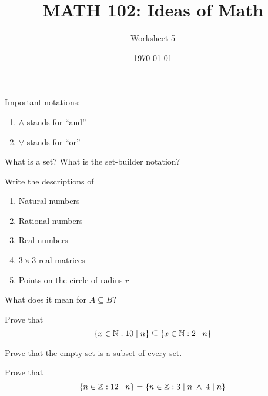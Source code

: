 \documentclass[12pt]{amsart}
\title{ MATH 102: Ideas  of Math }
\author{ Worksheet 5 }
\date{\today}
\begin{document}
\maketitle

Important notations:
\begin{enumerate}
	\item $\wedge$ stands for ``and''
	\item $\vee$ stands for ``or''
\end{enumerate}

\begin{question}
	What is a set? What is the set-builder notation?
\end{question}

\vspace{5cm}

\begin{question}
	Write the descriptions of
	\begin{enumerate}
		\item Natural numbers
		      \vspace{3cm}
		\item Rational numbers
		      \vspace{3cm}
		\item Real numbers
		      \vspace{3cm}
		\item $3\times 3$ real matrices
		      \vspace{3cm}
		\item Points on the circle of radius $r$
	\end{enumerate}
\end{question}

\begin{question}
	What does it mean for $A\subseteq B$?
\end{question}
\vspace{5cm}

\begin{question}
	Prove that
	\begin{equation*}
		\left\{ x\in \mathbb{N}: 10 \mid n  \right\}
		\subseteq
		\left\{ x\in \mathbb{N}: 2 \mid n  \right\}
	\end{equation*}
\end{question}
\vspace{5cm}

\begin{question}
	Prove that the empty set is a subset of every set.
\end{question}
\vspace{5cm}

\begin{question}
	Prove that
	\begin{equation*}
		\left\{ n\in \mathbb{Z} : 12\mid n   \right\}
		=
		\left\{ n\in \mathbb{Z} : 3\mid n \; \wedge \; 4 \mid n   \right\}
	\end{equation*}
\end{question}
\end{document}
